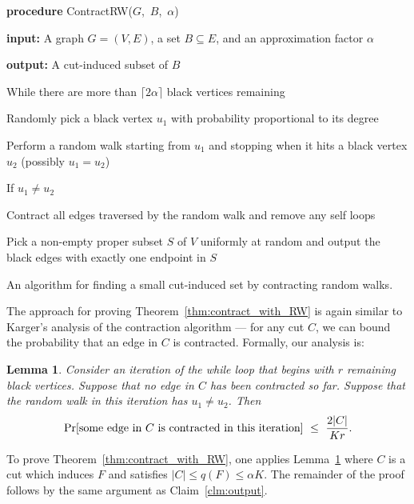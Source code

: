 \documentclass[11pt]{article}
\numberwithin{equation}{section}
\newenvironment{alg}{
    \begin{list}{}{
        \setlength{\itemsep}{2pt}
        \setlength{\parsep}{0pt}
        \setlength{\parskip}{0pt}
        \setlength{\topsep}{1pt}
    }
}
{
    \end{list}
}
\newtheorem{lemma}[theorem]{Lemma}
\newcommand{\abs}[1]{\lvert #1 \rvert}
\newcommand{\card}[1]{\abs{#1}}
\newcommand{\AlgorithmName}[1]{\label{alg:#1}}
\newcommand{\Claim}[1]{Claim~\ref{clm:#1}}
\newcommand{\LemmaName}[1]{\label{lem:#1}}
\newcommand{\Lemma}[1]{Lemma~\ref{lem:#1}}
\newcommand{\Theorem}[1]{Theorem~\ref{thm:#1}}
\begin{document}
\begin{algorithm}
\begin{alg}
    \item	\textbf{procedure} ContractRW($G$,\, $B$,\, $\alpha$)
    \item	\textbf{input:} A graph $G=(V,E)$, a set $B \subseteq E$,
            and an approximation factor $\alpha$
    \item	\textbf{output:} A cut-induced subset of $B$
	\item	While there are more than $\lceil 2 \alpha \rceil$ black vertices remaining
	\begin{alg}
        \item	Randomly pick a black vertex $u_1$ with probability proportional to its degree
\item	Perform a random walk starting from $u_1$ and
                stopping when it hits a black vertex $u_2$ (possibly $u_1=u_2$)
        \item   If $u_1 \neq u_2$
        \begin{alg}
            \item	Contract all edges traversed by the random walk and remove any self loops
        \end{alg}
    \end{alg}
	\item	Pick a non-empty proper subset $S$ of $V$ uniformly at random
	        and output the black edges with exactly one endpoint in $S$
\end{alg}
\caption{An algorithm for finding a small cut-induced set by contracting random walks.}
\AlgorithmName{contractRW}
\end{algorithm}

The approach for proving \Theorem{contract_with_RW}
is again similar to Karger's analysis of the contraction algorithm
--- for any cut $C$, we can bound the probability that an edge in $C$ is contracted. 
Formally, our analysis is:

\begin{lemma}
\LemmaName{rw}
Consider an iteration of the while loop that begins with $r$ remaining black vertices.
Suppose that no edge in $C$ has been contracted so far.
Suppose that the random walk in this iteration has $u_1 \neq u_2$.
Then
$$
\Pr[ \text{\normalfont some edge in $C$ is contracted in this iteration} ]
    ~\leq~
    \frac{2 \card{C}}{K r}.
$$
\end{lemma}

To prove \Theorem{contract_with_RW}, one applies \Lemma{rw}
where $C$ is a cut which induces $F$ and satisfies $\card{C} \leq q(F) \leq \alpha K$.
The remainder of the proof follows by the same argument as \Claim{output}.
\end{document}

